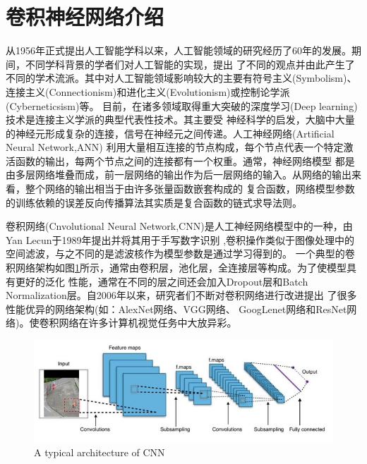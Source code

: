 \section{卷积神经网络介绍}
	从1956年正式提出人工智能学科以来，人工智能领域的研究经历了60年的发展。期间，不同学科背景的学者们对人工智能的实现，提出
	了不同的观点并由此产生了不同的学术流派。其中对人工智能领域影响较大的主要有符号主义(Symbolism)、
	连接主义(Connectionism)和进化主义(Evolutionism)或控制论学派(Cyberneticsism)等。
	目前，在诸多领域取得重大突破的深度学习(Deep learning)技术是连接主义学派的典型代表性技术。其主要受
	神经科学的启发，大脑中大量的神经元形成复杂的连接，信号在神经元之间传递。人工神经网络(Artificial Neural Network,ANN)
	利用大量相互连接的节点构成，每个节点代表一个特定激活函数的输出，每两个节点之间的连接都有一个权重。通常，神经网络模型
	都是由多层网络堆叠而成，前一层网络的输出作为后一层网络的输入。从网络的输出来看，整个网络的输出相当于由许多张量函数嵌套构成的
	复合函数，网络模型参数的训练依赖的误差反向传播算法其实质是复合函数的链式求导法则。
	
	卷积网络(Cnvolutional Neural Network,CNN)是人工神经网络模型中的一种，由Yan Lecun于1989年提出并将其用于手写数字识别
	\cite{le1989handwritten},卷积操作类似于图像处理中的空间滤波，与之不同的是滤波核作为模型参数是通过学习得到的。
	一个典型的卷积网络架构如图\ref{fig:chap4:cnn}所示，通常由卷积层，池化层，全连接层等构成。为了使模型具有更好的泛化
	性能，通常在不同的层之间还会加入Dropout层和Batch Normalization层。自2006年以来，研究者们不断对卷积网络进行改进提出
	了很多性能优异的网络架构(如：AlexNet网络\cite{krizhevsky2012imagenet}、VGG网络\cite{simonyan2014very}、
	GoogLenet网络\cite{szegedy2015going}和ResNet网络\cite{Kaiming2015Deep})。使卷积网络在许多计算机视觉任务中大放异彩。
	\begin{figure}[h]
	  \centering
	  \includegraphics[width=12cm]{figure/chap4/CNN-arch.png}
		{A typical architecture of CNN}
	  \label{fig:chap4:cnn}
	\end{figure}

